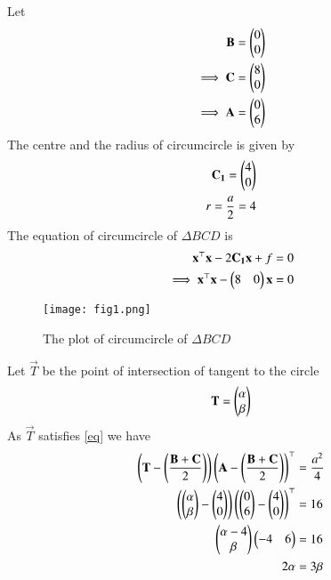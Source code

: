 \documentclass[journal,12pt,twocolumn]{IEEEtran}
\begin{document}
Let
\begin{align}
    \mathbf{B}=\begin{pmatrix}0\\0\end{pmatrix}\\
    \implies \mathbf{C}=\begin{pmatrix}8\\0\end{pmatrix}\\
    \implies  \mathbf{A}=\begin{pmatrix}0\\6\end{pmatrix}
\end{align}
The centre and the radius of circumcircle is given by 
\begin{align}
    \mathbf{C_1}=\begin{pmatrix}4\\0\end{pmatrix}\\
    r = \frac{a}{2}=4
\end{align}
The equation of circumcircle of $\Delta BCD$ is 
\begin{align}
    \mathbf{x}^\top\mathbf{x}-2\mathbf{C_1}\mathbf{x}+f &=0\\
    \implies \mathbf{x}^\top\mathbf{x}-\begin{pmatrix}8&0\end{pmatrix}\mathbf{x}&=0
    \label{eq4}
\end{align}
\begin{figure}[!ht]
   \centering
   \texttt{[image: fig1.png]}
   \caption{The plot of circumcircle of $\Delta BCD$}
\end{figure}
Let $\vec{T}$ be the point of intersection of tangent to the circle
\begin{align}
    \mathbf{T}=\begin{pmatrix}\alpha\\ \beta\end{pmatrix}
\end{align}
As $\vec{T}$ satisfies \ref{eq} we have
\begin{align}
    \left(\mathbf{T}-\left(\frac{\mathbf{B}+\mathbf{C}}{2}\right)\right)\left(\mathbf{A}-\left(\frac{\mathbf{B}+\mathbf{C}}{2}\right)\right)^\top&=\frac{a^{2}}{4}\\
    \left(\begin{pmatrix}\alpha\\ \beta\end{pmatrix}-\begin{pmatrix}4\\0\end{pmatrix}\right)\left(\begin{pmatrix}0\\6\end{pmatrix}-\begin{pmatrix}4\\0\end{pmatrix}\right)^\top&=16\\
    \begin{pmatrix}\alpha-4\\ \beta\end{pmatrix}\begin{pmatrix}-4&6\end{pmatrix}&=16\\
    2\alpha&=3\beta
    \label{eq3}
\end{align}
\end{document}
